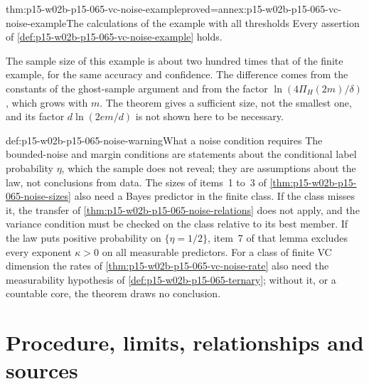 \begin{hbtheorem}{thm:p15-w02b-p15-065-vc-noise-example}{proved=annex:p15-w02b-p15-065-vc-noise-example}{The calculations of the example with all thresholds}
Every assertion of \cref{def:p15-w02b-p15-065-vc-noise-example} holds.
\end{hbtheorem}

The sample size of this example is about two hundred times that of the
finite example, for the same accuracy and confidence. The difference comes
from the constants of the ghost-sample argument and from the factor
\(\ln(4\Pi_H(2m)/\delta)\), which grows with \(m\). The theorem gives a
sufficient size, not the smallest one, and its factor \(d\ln(2em/d)\) is
not shown here to be necessary.

\begin{hbwarning}{def:p15-w02b-p15-065-noise-warning}{What a noise condition requires}
The bounded-noise and margin conditions are statements about the
conditional label probability \(\eta\), which the sample does not reveal;
they are assumptions about the law, not conclusions from data. The sizes
of items~1 to~3 of \cref{thm:p15-w02b-p15-065-noise-sizes} also need a
Bayes predictor in the finite class. If the class misses it, the transfer
of \cref{thm:p15-w02b-p15-065-noise-relations} does not apply, and the
variance condition must be checked on the class relative to its best
member. If the law puts positive probability on \(\{\eta=1/2\}\), item~7
of that lemma excludes every exponent \(\kappa>0\) on all measurable
predictors. For a class of finite VC dimension the rates of
\cref{thm:p15-w02b-p15-065-vc-noise-rate} also need the measurability
hypothesis of \cref{def:p15-w02b-p15-065-ternary}; without it, or a
countable core, the theorem draws no conclusion.
\end{hbwarning}

\section{Procedure, limits, relationships and sources}
\label{sec:p15-w02b-p15-065-procedure}

